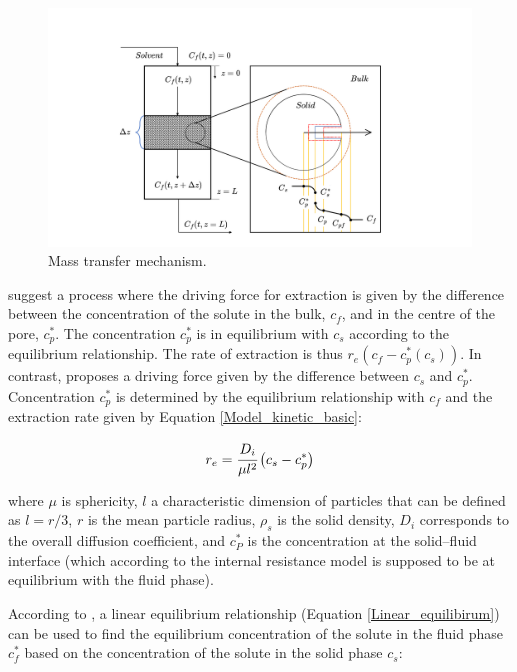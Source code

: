 \documentclass[a4paper,fleqn]{cas-dc}
\begin{document}
			\begin{figure}[h!]
				\centering
				\includegraphics[trim = 45cm 0cm 60cm 20cm,clip,width=0.85\columnwidth]{Figures/SFE_PFD.drawio.png}	
				\caption{Mass transfer mechanism.}
				\label{fig: SFE_Mechanism}
			\end{figure}
			
			\citet{Bulley1984} suggest a process where the driving force for extraction is given by the difference between the concentration of the solute in the bulk, $c_f$, and in the centre of the pore, $c_p^*$. The concentration $c_p^*$ is in equilibrium with $c_s$ according to the equilibrium relationship. The rate of extraction is thus $r_e\left(c_f - c^*_p(c_s)\right)$. In contrast, \citet{Reverchon1996} proposes a driving force given by the difference between $c_s$ and $c_p^*$. Concentration $c_p^*$ is determined by the equilibrium relationship with $c_f$ and the extraction rate given by Equation \ref{Model_kinetic_basic}:
			
			{\footnotesize
				\begin{equation} \label{Model_kinetic_basic}
					r_e = \cfrac{D_i}{\mu l^2 }\left(c_s - c_p^* \right)
			\end{equation} }
			
			where $\mu$ is sphericity, $l$ a characteristic dimension of particles that can be defined as $l = r/3$, $r$ is the mean particle radius, $\rho_s$ is the solid density, $D_i$ corresponds to the overall diffusion coefficient, and $c_P^*$ is the concentration at the solid--fluid interface (which according to the internal resistance model is supposed to be at equilibrium with the fluid phase). 
			
			According to \citet{Bulley1984}, a linear equilibrium relationship (Equation \ref{Linear_equilibirum}) can be used to find the equilibrium concentration of the solute in the fluid phase $c_f^*$ based on the concentration of the solute in the solid phase $c_s$:
			
\end{document}
